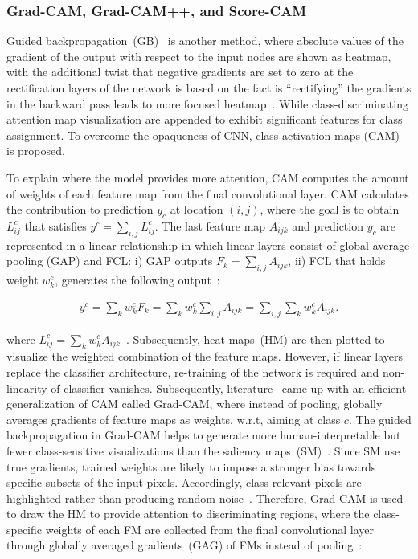 \subsubsection{Grad-CAM, Grad-CAM++, and Score-CAM}
Guided backpropagation~(GB)~\cite{springenberg2014striving} is another method, where absolute values of the gradient of the output with respect to the input nodes are shown as heatmap, with the additional twist that negative gradients are set to zero at the rectification layers of the network is based on the fact is ``rectifying” the gradients in the backward pass leads to more focused heatmap~\cite{bohle2019layer}. While class-discriminating attention map visualization are appended to exhibit significant features for class assignment. To overcome the opaqueness of CNN, class activation maps (CAM)~\cite{zhou2016learning} is proposed. 

\hspace*{3.5mm} To explain where the model provides more attention, CAM computes the amount of weights of each feature map from the final convolutional layer. CAM calculates the contribution to prediction $y_c$ at location $(i,j)$, where the goal is to obtain $L_{ij}^{c}$ that satisfies $y^{c}=\sum_{i, j} L_{ij}^{c}$. The last feature map $A_{ijk}$ and prediction $y_c$ are represented in a linear relationship in which linear layers consist  of global average pooling (GAP) and FCL: i) GAP outputs $F_{k}=\sum_{i,j} A_{ijk}$, ii) FCL that holds weight $w_{k}^{c}$, generates the following output~\cite{kim2020extending}: 
 
 \vspace{-4mm}
 \begin{align}
     y^{c}=\sum_{k} w_{k}^{c} F_{k}=\sum_{k} w_{k}^{c} \sum_{i, j} A_{i j k}=\sum_{i, j} \sum_{k} w_{k}^{c} A_{i j k}.
 \end{align}
 \vspace{-4mm}
 
\hspace*{3.5mm} where $L_{i j}^{c}=\sum_{k} w_{k}^{c} A_{i j k}$~\cite{kim2020extending}. Subsequently, heat maps~(HM) are then plotted to visualize the weighted combination of the feature maps. However, if linear layers replace the classifier architecture, re-training of the network is required and non-linearity of classifier vanishes. Subsequently, literature~\cite{114} came up with an efficient generalization of CAM called Grad-CAM, where instead of pooling, globally averages gradients of feature maps as weights, w.r.t, aiming at class $c$. The guided backpropagation in Grad-CAM helps to generate more human-interpretable but fewer class-sensitive visualizations than the saliency maps~(SM)~\cite{nie2018theoretical}. Since SM use true gradients, trained weights are likely to impose a stronger bias towards specific subsets of the input pixels. Accordingly, class-relevant pixels are highlighted rather than producing random noise~\cite{nie2018theoretical}. Therefore, Grad-CAM is used to draw the HM to provide attention to discriminating regions, where the class-specific weights of each FM are collected from the final convolutional layer through globally averaged gradients~(GAG) of FMs instead of pooling~\cite{chattopadhay2018grad}: 

